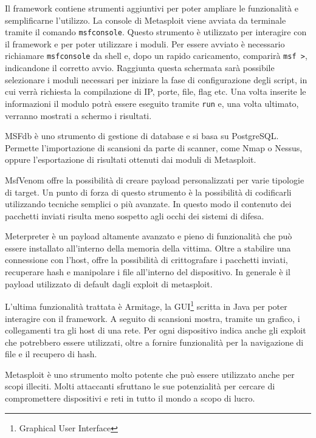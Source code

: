 \documentclass[12pt]{report}
\begin{document}
Il framework contiene strumenti aggiuntivi per poter ampliare le funzionalità e semplificarne l'utilizzo.
La console di Metasploit viene avviata da terminale tramite il comando \lstinline{msfconsole}. Questo strumento è utilizzato per interagire con il framework e per poter utilizzare i moduli. Per essere avviato è necessario richiamare \lstinline{msfconsole} da shell e, dopo un rapido caricamento, comparirà \lstinline{msf >}, indicandone il corretto avvio. Raggiunta questa schermata sarà possibile selezionare i moduli necessari per iniziare la fase di configurazione degli script, in cui verrà richiesta la compilazione di IP, porte, file, flag etc. Una volta inserite le informazioni il modulo potrà essere eseguito tramite \lstinline{run} e, una volta ultimato, verranno mostrati a schermo i risultati.

MSFdb è uno strumento di gestione di database e si basa su PostgreSQL. Permette l'importazione di scansioni da parte di scanner, come Nmap o Nessus, oppure l'esportazione di risultati ottenuti dai moduli di Metasploit. 

MsfVenom offre la possibilità di creare payload personalizzati per varie tipologie di target. Un punto di forza di questo strumento è la possibilità di codificarli utilizzando tecniche semplici o più avanzate. In questo modo il contenuto dei pacchetti inviati risulta meno sospetto agli occhi dei sistemi di difesa.

Meterpreter è un payload altamente avanzato e pieno di funzionalità che può essere installato all'interno della memoria della vittima. Oltre a stabilire una connessione con l'host, offre la possibilità di crittografare i pacchetti inviati, recuperare hash e manipolare i file all'interno del dispositivo. In generale è il payload utilizzato di default dagli exploit di metasploit.

L'ultima funzionalità trattata è Armitage, la GUI\footnote{Graphical User Interface} scritta in Java per poter interagire con il framework. A seguito di scansioni mostra, tramite un grafico, i collegamenti tra gli host di una rete. Per ogni dispositivo indica anche gli exploit che potrebbero essere utilizzati, oltre a fornire funzionalità per la navigazione di file e il recupero di hash.

Metasploit è uno strumento molto potente che può essere utilizzato anche per scopi illeciti. Molti attaccanti sfruttano le sue potenzialità per cercare di compromettere dispositivi e reti in tutto il mondo a scopo di lucro.

% 
% 
\end{document}
